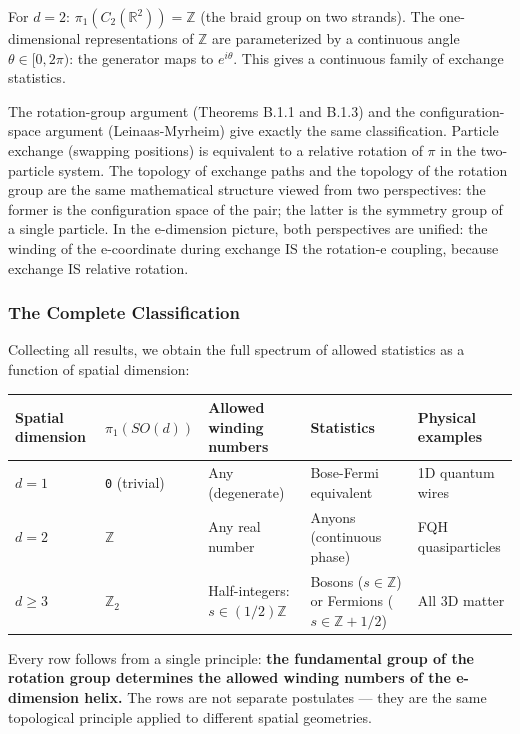 \documentclass[aps,prd,preprint,superscriptaddress,longbibliography,floatfix]{revtex4-2}
\theoremstyle{remark}
\begin{document}
For $d = 2$: $\pi_{1}(C_{2}(\mathbb{R}^{2})) = \mathbb{Z}$ (the braid group on two strands). The one-dimensional representations of \texttt{$\mathbb{Z}$} are parameterized by a continuous angle $\theta \in [0, 2\pi)$: the generator maps to $e^{i\theta}$. This gives a continuous family of exchange statistics.

The rotation-group argument (Theorems B.1.1 and B.1.3) and the configuration-space argument (Leinaas-Myrheim) give exactly the same classification. Particle exchange (swapping positions) is equivalent to a relative rotation of $\pi$ in the two-particle system. The topology of exchange paths and the topology of the rotation group are the same mathematical structure viewed from two perspectives: the former is the configuration space of the pair; the latter is the symmetry group of a single particle. In the e-dimension picture, both perspectives are unified: the winding of the e-coordinate during exchange IS the rotation-e coupling, because exchange IS relative rotation.


\subsubsection{The Complete Classification}

Collecting all results, we obtain the full spectrum of allowed statistics as a function of spatial dimension:


\begin{table}[H]
\begin{ruledtabular}
\begin{tabular}{p{3.0cm}p{3.0cm}p{3.0cm}p{3.0cm}p{3.0cm}}
Spatial dimension & $\pi_{1}(SO(d))$ & Allowed winding numbers & Statistics & Physical examples \\
\hline
$d = 1$ & \texttt{0} (trivial) & Any (degenerate) & Bose-Fermi equivalent & 1D quantum wires \\
$d = 2$ & \textbf{\texttt{$\mathbb{Z}$}} & Any real number & Anyons (continuous phase) & FQH quasiparticles \\
$d \geq 3$ & \textbf{$\mathbb{Z}_{2}$} & Half-integers: $s \in (1/2)\mathbb{Z}$ & Bosons ($s \in \mathbb{Z}$) or Fermions ($s \in \mathbb{Z}+1/2$) & All 3D matter \\
\end{tabular}
\end{ruledtabular}
\end{table}

Every row follows from a single principle: \textbf{the fundamental group of the rotation group determines the allowed winding numbers of the e-dimension helix.} The rows are not separate postulates --- they are the same topological principle applied to different spatial geometries.
\end{document}
